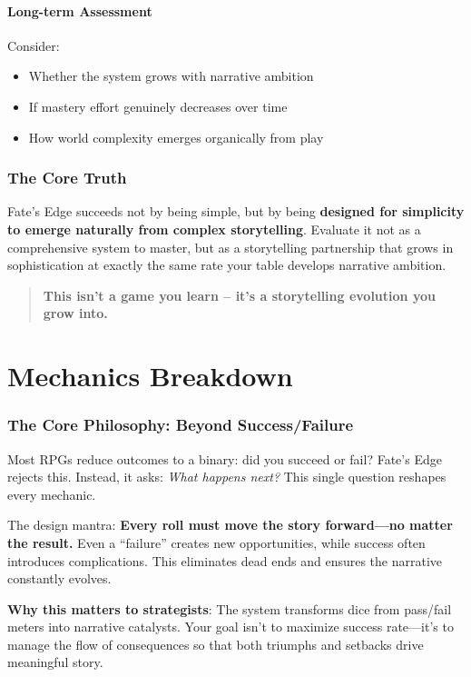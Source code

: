 \documentclass[11pt]{article}
\begin{document}
\subsection{Long-term Assessment}
Consider:
\begin{itemize}
    \item Whether the system grows with narrative ambition
    \item If mastery effort genuinely decreases over time
    \item How world complexity emerges organically from play
\end{itemize}

\section{The Core Truth}

Fate's Edge succeeds not by being simple, but by being \textbf{designed for simplicity to emerge naturally from complex storytelling}. Evaluate it not as a comprehensive system to master, but as a storytelling partnership that grows in sophistication at exactly the same rate your table develops narrative ambition.

\begin{quote}
\textbf{This isn't a game you learn – it's a storytelling evolution you grow into.}
\end{quote}

\newpage

\part{Mechanics Breakdown}

\section{The Core Philosophy: Beyond Success/Failure}

Most RPGs reduce outcomes to a binary: did you succeed or fail? Fate's Edge rejects this. Instead, it asks: \textit{What happens next?} This single question reshapes every mechanic.

The design mantra: \textbf{Every roll must move the story forward—no matter the result.} Even a ``failure'' creates new opportunities, while success often introduces complications. This eliminates dead ends and ensures the narrative constantly evolves.

\textbf{Why this matters to strategists}: The system transforms dice from pass/fail meters into narrative catalysts. Your goal isn't to maximize success rate—it's to manage the flow of consequences so that both triumphs and setbacks drive meaningful story.
\end{document}
